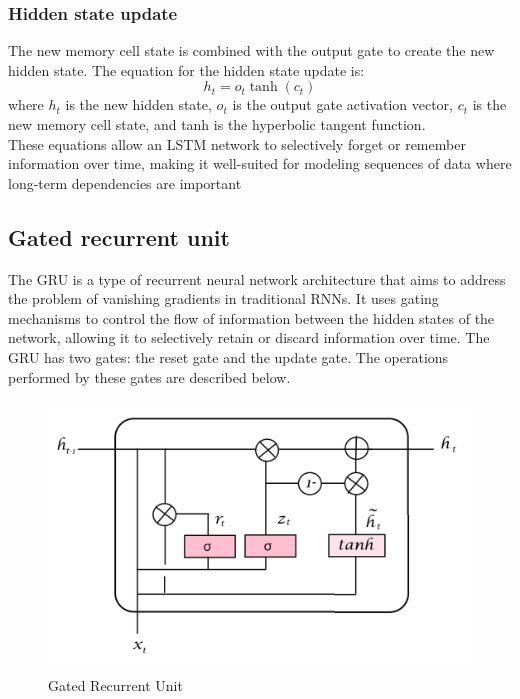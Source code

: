 \documentclass[a4paper, noexaminfo]{sapthesis}
\begin{document}
\subsubsection{Hidden state update}
The new memory cell state is combined with the output gate
 to create the new hidden state. The equation for the hidden state update is:
 \begin{equation}
  h_t = o_t \tanh(c_t)
  \end{equation}
where $h_t$ is the new hidden state, $o_t$ is the output gate activation vector,
 $c_t$ is the new memory cell state, and tanh is the hyperbolic tangent function.\newline \\
These equations allow an LSTM network to selectively forget or remember
 information over time, making it well-suited for modeling sequences of
  data where long-term dependencies are important
\subsection{Gated recurrent unit}
The GRU is a type of recurrent neural network architecture that aims to 
address the problem of vanishing gradients in traditional RNNs. It uses 
gating mechanisms to control the flow of information between the hidden 
states of the network, allowing it to selectively retain or discard 
information over time.\newline
The GRU has two gates: the reset gate and the update gate. The operations 
performed by these gates are described below.
\begin{figure}[h!]
  \includegraphics[scale=0.4]{images/gru.png}
  \centering
  \caption{Gated Recurrent Unit}\label{fig:gru}
  \end{figure}
\end{document}

